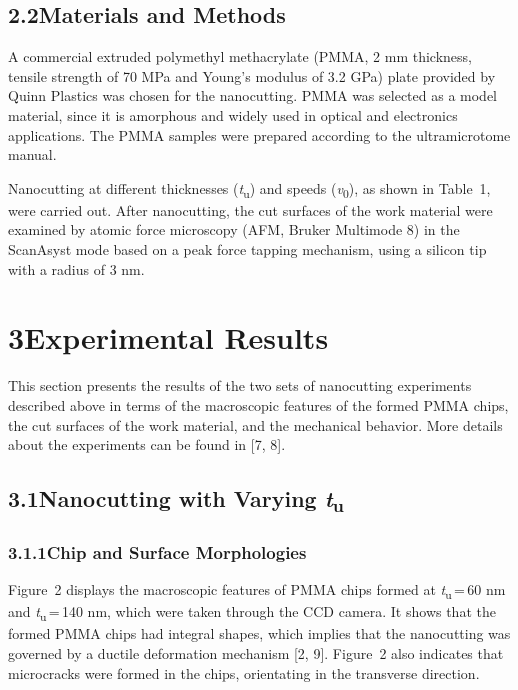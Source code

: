 \documentclass{article}
\begin{document}
\subsection*{2.2\quad Materials and Methods}

A commercial extruded polymethyl methacrylate (PMMA, 2 mm thickness, tensile strength of 70 MPa and Young’s modulus of 3.2 GPa) plate provided by Quinn Plastics was chosen for the nanocutting. PMMA was selected as a model material, since it is amorphous and widely used in optical and electronics applications. The PMMA samples were prepared according to the ultramicrotome manual.

Nanocutting at different thicknesses (\emph{t}\textsubscript{u}) and speeds (\emph{v}\textsubscript{0}), as shown in Table~1, were carried out. After nanocutting, the cut surfaces of the work material were examined by atomic force microscopy (AFM, Bruker Multimode 8) in the ScanAsyst mode based on a peak force tapping mechanism, using a silicon tip with a radius of 3 nm.

\section*{3\quad Experimental Results}

This section presents the results of the two sets of nanocutting experiments described above in terms of the macroscopic features of the formed PMMA chips, the cut surfaces of the work material, and the mechanical behavior. More details about the experiments can be found in [7, 8].

\subsection*{3.1\quad Nanocutting with Varying \emph{t}\textsubscript{u}}

\subsubsection*{3.1.1\quad Chip and Surface Morphologies}

Figure~2 displays the macroscopic features of PMMA chips formed at \emph{t}\textsubscript{u}\,=\,60 nm and \emph{t}\textsubscript{u}\,=\,140 nm, which were taken through the CCD camera. It shows that the formed PMMA chips had integral shapes, which implies that the nanocutting was governed by a ductile deformation mechanism [2, 9]. Figure~2 also indicates that microcracks were formed in the chips, orientating in the transverse direction.
\end{document}
